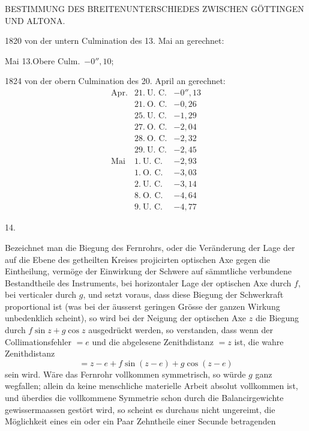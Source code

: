 \clearpage
\noindent{}\parbox[t]{\dimexpr\textwidth-10mm\relax}{\centering\scriptsize BESTIMMUNG DES BREITENUNTERSCHIEDES ZWISCHEN GÖTTINGEN UND ALTONA.}\par
1820 von der untern Culmination des 13. Mai an gerechnet:
\begin{center}Mai 13.\quad Obere Culm.\ $-0''{,}10$;\end{center}
1824 von der obern Culmination des 20. April an gerechnet:
\[
\begin{array}{rl|r}
\text{Apr.}&21.\ \text{U. C.}&-0''{,}13\\
&21.\ \text{O. C.}&-0{,}26\\
&25.\ \text{U. C.}&-1{,}29\\
&27.\ \text{O. C.}&-2{,}04\\
&28.\ \text{O. C.}&-2{,}32\\
&29.\ \text{U. C.}&-2{,}45\\
\text{Mai}&1.\ \text{U. C.}&-2{,}93\\
&1.\ \text{O. C.}&-3{,}03\\
&2.\ \text{U. C.}&-3{,}14\\
&8.\ \text{O. C.}&-4{,}64\\
&9.\ \text{U. C.}&-4{,}77
\end{array}
\]
\begin{center}14.\end{center}
Bezeichnet man die Biegung des Fernrohrs, oder die Veränderung der Lage der auf die Ebene des getheilten Kreises projicirten optischen Axe gegen die Eintheilung, vermöge der Einwirkung der Schwere auf sämmtliche verbundene Bestandtheile des Instruments, bei horizontaler Lage der optischen Axe durch $f$, bei verticaler durch $g$, und setzt voraus, dass diese Biegung der Schwerkraft proportional ist (was bei der äusserst geringen Grösse der ganzen Wirkung unbedenklich scheint), so wird bei der Neigung der optischen Axe $z$ die Biegung durch $f\sin z+g\cos z$ ausgedrückt werden, so verstanden, dass wenn der Collimationsfehler $=e$ und die abgelesene Zenithdistanz $=z$ ist, die wahre Zenithdistanz
\[
=z-e+f\sin(z-e)+g\cos(z-e)
\]
sein wird. Wäre das Fernrohr vollkommen symmetrisch, so würde $g$ ganz wegfallen; allein da keine menschliche materielle Arbeit absolut vollkommen ist, und überdies die vollkommene Symmetrie schon durch die Balancirgewichte gewissermaassen gestört wird, so scheint es durchaus nicht ungereimt, die Möglichkeit eines ein oder ein Paar Zehntheile einer Secunde betragenden

